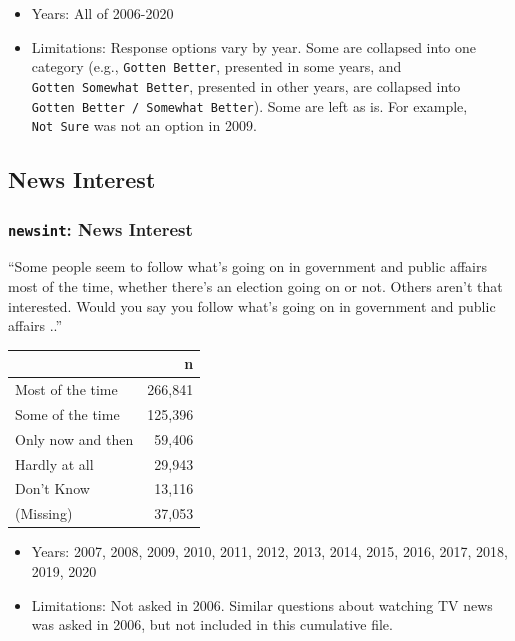 \documentclass[10pt,article,oneside]{memoir}
\theoremstyle{definition}
\begin{document}
\begin{itemize}
\tightlist
\item
  Years: All of 2006-2020
\item
  Limitations: Response options vary by year. Some are collapsed into
  one category (e.g., \texttt{Gotten\ Better}, presented in some years,
  and \texttt{Gotten\ Somewhat\ Better}, presented in other years, are
  collapsed into \texttt{Gotten\ Better\ /\ Somewhat\ Better}). Some are
  left as is. For example, \texttt{Not\ Sure} was not an option in 2009.
\end{itemize}

\hypertarget{news-interest}{%
\subsection{News Interest}\label{news-interest}}

\hypertarget{newsint-news-interest}{%
\subsubsection{\texorpdfstring{\texttt{newsint}: News
Interest}{newsint: News Interest}}\label{newsint-news-interest}}

``Some people seem to follow what's going on in government and public
affairs most of the time, whether there's an election going on or not.
Others aren't that interested. Would you say you follow what's going on
in government and public affairs ..''

\begin{table}[H]
\centering
\begin{tabular}[t]{lr}
\toprule
 & n\\
\midrule
Most of the time & 266,841\\
Some of the time & 125,396\\
Only now and then & 59,406\\
Hardly at all & 29,943\\
Don't Know & 13,116\\
(Missing) & 37,053\\
\bottomrule
\end{tabular}
\end{table}

\begin{itemize}
\tightlist
\item
  Years: 2007, 2008, 2009, 2010, 2011, 2012, 2013, 2014, 2015, 2016,
  2017, 2018, 2019, 2020
\item
  Limitations: Not asked in 2006. Similar questions about watching TV
  news was asked in 2006, but not included in this cumulative file.
\end{itemize}
\end{document}
